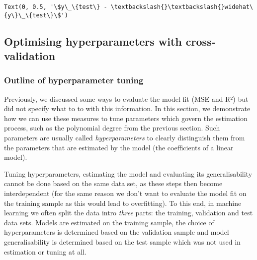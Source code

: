 \documentclass{scrartcl}
\makeatletter
\newcommand{\boxspacing}{\kern\kvtcb@left@rule\kern\kvtcb@boxsep}
\newcommand{\prompt}[4]{
        {\ttfamily\llap{{\color{#2}[#3]:\hspace{3pt}#4}}\vspace{-\baselineskip}}
    }
\makeatother
\begin{document}
            \begin{tcolorbox}[breakable, size=fbox, boxrule=.5pt, pad at break*=1mm, opacityfill=0]
\prompt{Out}{outcolor}{26}{\boxspacing}
\begin{Verbatim}[commandchars=\\\{\}]
Text(0, 0.5, '\$y\_\{test\} - \textbackslash{}\textbackslash{}widehat\{y\}\_\{test\}\$')
\end{Verbatim}
\end{tcolorbox}
        
    \begin{center}
    \end{center}
    

\hypertarget{optimising-hyperparameters-with-cross-validation}{%
\subsection{Optimising hyperparameters with
cross-validation}\label{optimising-hyperparameters-with-cross-validation}}

\hypertarget{outline-of-hyperparameter-tuning}{%
\subsubsection{Outline of hyperparameter
tuning}\label{outline-of-hyperparameter-tuning}}

Previously, we discussed some ways to evaluate the model fit (MSE and
R²) but did not specify what to to with this information. In this
section, we demonstrate how we can use these measures to tune parameters
which govern the estimation process, such as the polynomial degree from
the previous section. Such parameters are usually called
\emph{hyperparameters} to clearly distinguish them from the parameters
that are estimated by the model (\eg the coefficients of a linear
model).

Tuning hyperparameters, estimating the model and evaluating its
generalisability cannot be done based on the same data set, as these
steps then become interdependent (for the same reason we don't want to
evaluate the model fit on the training sample as this would lead to
overfitting). To this end, in machine learning we often split the data
intro \emph{three} parts: the training, validation and test data sets.
Models are estimated on the training sample, the choice of
hyperparameters is determined based on the validation sample and model
generalisability is determined based on the test sample which was not
used in estimation or tuning at all.
\end{document}
